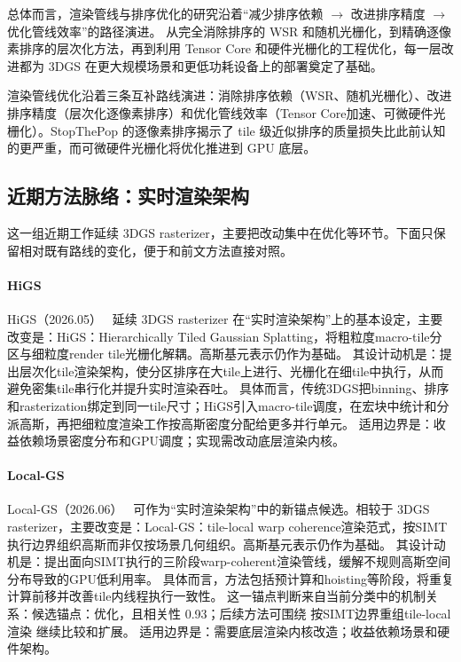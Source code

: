 总体而言，渲染管线与排序优化的研究沿着“减少排序依赖 $\to$ 改进排序精度 $\to$ 优化管线效率”的路径演进。
从完全消除排序的 WSR 和随机光栅化，到精确逐像素排序的层次化方法，再到利用 Tensor Core 和硬件光栅化的工程优化，每一层改进都为 3DGS 在更大规模场景和更低功耗设备上的部署奠定了基础。

\begin{takeaway}
渲染管线优化沿着三条互补路线演进：消除排序依赖（WSR、随机光栅化）、改进排序精度（层次化逐像素排序）和优化管线效率（Tensor Core加速、可微硬件光栅化）。StopThePop 的逐像素排序揭示了 tile 级近似排序的质量损失比此前认知的更严重，而可微硬件光栅化将优化推进到 GPU 底层。
\end{takeaway}

\subsection{近期方法脉络：实时渲染架构}

这一组近期工作延续 3DGS rasterizer，主要把改动集中在优化等环节。下面只保留相对既有路线的变化，便于和前文方法直接对照。

\paragraph{HiGS}
HiGS（2026.05）~\cite{2606_00352} 延续 3DGS rasterizer 在“实时渲染架构”上的基本设定，主要改变是：HiGS：Hierarchically Tiled Gaussian Splatting，将粗粒度macro-tile分区与细粒度render tile光栅化解耦。高斯基元表示仍作为基础。
其设计动机是：提出层次化tile渲染架构，使分区排序在大tile上进行、光栅化在细tile中执行，从而避免密集tile串行化并提升实时渲染吞吐。
具体而言，传统3DGS把binning、排序和rasterization绑定到同一tile尺寸；HiGS引入macro-tile调度，在宏块中统计和分派高斯，再把细粒度渲染工作按高斯密度分配给更多并行单元。
适用边界是：收益依赖场景密度分布和GPU调度；实现需改动底层渲染内核。

\paragraph{Local-GS}
Local-GS（2026.06）~\cite{2606_16566} 可作为“实时渲染架构”中的新锚点候选。相较于 3DGS rasterizer，主要改变是：Local-GS：tile-local warp coherence渲染范式，按SIMT执行边界组织高斯而非仅按场景几何组织。高斯基元表示仍作为基础。
其设计动机是：提出面向SIMT执行的三阶段warp-coherent渲染管线，缓解不规则高斯空间分布导致的GPU低利用率。
具体而言，方法包括预计算和hoisting等阶段，将重复计算前移并改善tile内线程执行一致性。
这一锚点判断来自当前分类中的机制关系：候选锚点：优化，且相关性 0.93；后续方法可围绕 按SIMT边界重组tile-local渲染 继续比较和扩展。
适用边界是：需要底层渲染内核改造；收益依赖场景和硬件架构。

